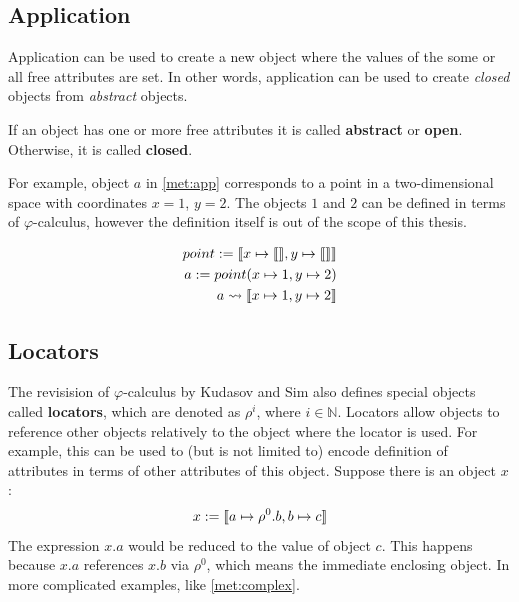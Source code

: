 \subsection{Application}
Application can be used to create a new object where the values of the some or all free attributes are set. In other words, application can be used to create \textit{closed} objects from \textit{abstract} objects.

\begin{definition}
    If an object has one or more free attributes it is called \textbf{abstract} or \textbf{open}. Otherwise, it is called \textbf{closed}.
\end{definition}

For example, object $a$ in \ref{met:app} corresponds to a point in a two-dimensional space with coordinates $x = 1$, $y = 2$. The objects $1$ and $2$ can be defined in terms of $\varphi$-calculus, however the definition itself is out of the scope of this thesis.

\begin{align}
    point := \llbracket x \mapsto \llbracket  \rrbracket, y \mapsto \llbracket \rrbracket \rrbracket \\
    \label{met:app}
    a := point(x \mapsto 1, y \mapsto 2)                           \\
    a \rightsquigarrow \llbracket x \mapsto 1, y \mapsto 2 \rrbracket
\end{align}


\subsection{Locators}

The revisision of $\varphi$-calculus by Kudasov and Sim \cite{kudasov} also defines special objects called \textbf{locators}, which are denoted as $\rho^i$, where $i \in \mathbb{N}$. Locators allow objects to reference other objects relatively to the object where the locator is used. For example, this can be used to (but is not limited to) encode definition of attributes in terms of other attributes of this object. Suppose there is an object $x$:
\begin{align*}
    x := \llbracket a \mapsto \rho^0.b, b \mapsto c \rrbracket
\end{align*}
The expression $x.a$ would be reduced to the value of object $c$. This happens because $x.a$ references $x.b$ via $\rho^0$, which means the immediate enclosing object. In more complicated examples, like \ref{met:complex}.

